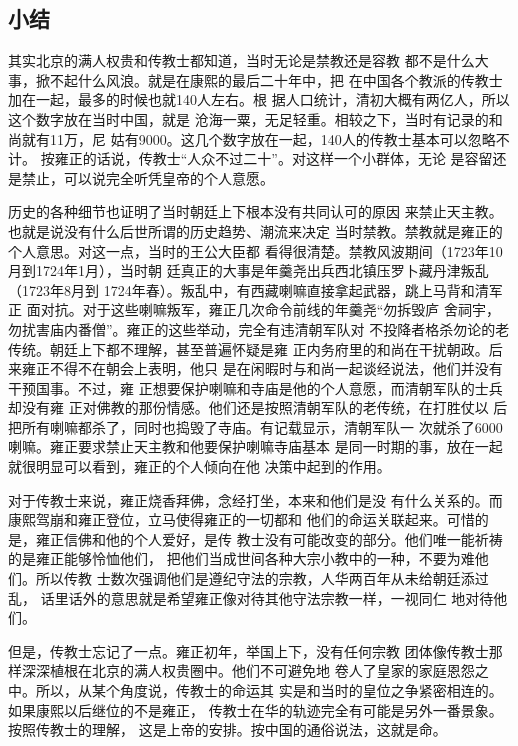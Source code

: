 \subsection{小结}
\par
其实北京的满人权贵和传教士都知道，当时无论是禁教还是容教%
都不是什么大事，掀不起什么风浪。就是在康熙的最后二十年中，把%
在中国各个教派的传教士加在一起，最多的时候也就140人左右。根%
据人口统计，清初大概有两亿人，所以这个数字放在当时中国，就是%
沧海一粟，无足轻重。相较之下，当时有记录的和尚就有11万，尼%
姑有9000。这几个数字放在一起，140人的传教士基本可以忽略不计。%
按雍正的话说，传教士“人众不过二十”。对这样一个小群体，无论%
是容留还是禁止，可以说完全听凭皇帝的个人意愿。%
\par
历史的各种细节也证明了当时朝廷上下根本没有共同认可的原因%
来禁止天主教。也就是说没有什么后世所谓的历史趋势、潮流来决定%
当时禁教。禁教就是雍正的个人意思。对这一点，当时的王公大臣都%
看得很清楚。禁教风波期间（1723年10月到1724年1月），当时朝%
廷真正的大事是年羹尧出兵西北镇压罗卜藏丹津叛乱（1723年8月到%
1724年春）。叛乱中，有西藏喇嘛直接拿起武器，跳上马背和清军正%
面对抗。对于这些喇嘛叛军，雍正几次命令前线的年羹尧“勿拆毁庐%
舍祠宇，勿扰害庙内番僧”。雍正的这些举动，完全有违清朝军队对%
不投降者格杀勿论的老传统。朝廷上下都不理解，甚至普遍怀疑是雍%
正内务府里的和尚在干扰朝政。后来雍正不得不在朝会上表明，他只%
是在闲暇时与和尚一起谈经说法，他们并没有干预国事。不过，雍%
正想要保护喇嘛和寺庙是他的个人意愿，而清朝军队的士兵却没有雍%
正对佛教的那份情感。他们还是按照清朝军队的老传统，在打胜仗以%
后把所有喇嘛都杀了，同时也捣毁了寺庙。有记载显示，清朝军队一%
次就杀了6000喇嘛。雍正要求禁止天主教和他要保护喇嘛寺庙基本%
是同一时期的事，放在一起就很明显可以看到，雍正的个人倾向在他%
决策中起到的作用。%
\par
对于传教士来说，雍正烧香拜佛，念经打坐，本来和他们是没%
有什么关系的。而康熙驾崩和雍正登位，立马使得雍正的一切都和%
他们的命运关联起来。可惜的是，雍正信佛和他的个人爱好，是传%
教士没有可能改变的部分。他们唯一能祈祷的是雍正能够怜恤他们，%
把他们当成世间各种大宗小教中的一种，不要为难他们。所以传教%
士数次强调他们是遵纪守法的宗教，人华两百年从未给朝廷添过乱，%
话里话外的意思就是希望雍正像对待其他守法宗教一样，一视同仁%
地对待他们。%
\par
但是，传教士忘记了一点。雍正初年，举国上下，没有任何宗教%
团体像传教士那样深深植根在北京的满人权贵圈中。他们不可避免地%
卷人了皇家的家庭恩怨之中。所以，从某个角度说，传教士的命运其%
实是和当时的皇位之争紧密相连的。如果康熙以后继位的不是雍正，%
传教士在华的轨迹完全有可能是另外一番景象。按照传教士的理解，%
这是上帝的安排。按中国的通俗说法，这就是命。%
